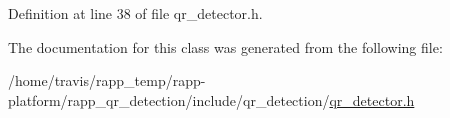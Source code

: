 Definition at line 38 of file qr\-\_\-detector.\-h.



The documentation for this class was generated from the following file\-:\begin{DoxyCompactItemize}
\item 
/home/travis/rapp\-\_\-temp/rapp-\/platform/rapp\-\_\-qr\-\_\-detection/include/qr\-\_\-detection/\hyperlink{qr__detector_8h}{qr\-\_\-detector.\-h}\end{DoxyCompactItemize}

